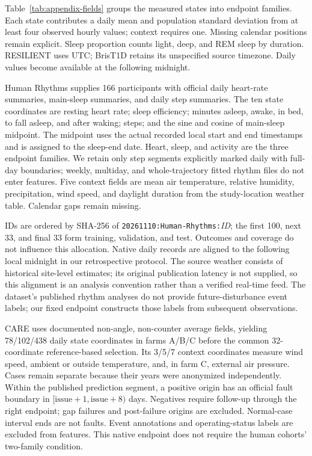 Table~\ref{tab:appendix-fields} groups the measured states into endpoint families. Each state contributes a daily mean and population standard deviation from at least four observed hourly values; context requires one. Missing calendar positions remain explicit. Sleep proportion counts light, deep, and REM sleep by duration. RESILIENT uses UTC; BrisT1D retains its unspecified source timezone. Daily values become available at the following midnight.

Human Rhythms \citep{hneD07} supplies 166 participants with official daily heart-rate summaries, main-sleep summaries, and daily step summaries. The ten state coordinates are resting heart rate; sleep efficiency; minutes asleep, awake, in bed, to fall asleep, and after waking; steps; and the sine and cosine of main-sleep midpoint. The midpoint uses the actual recorded local start and end timestamps and is assigned to the sleep-end date. Heart, sleep, and activity are the three endpoint families. We retain only step segments explicitly marked daily with full-day boundaries; weekly, multiday, and whole-trajectory fitted rhythm files do not enter features. Five context fields are mean air temperature, relative humidity, precipitation, wind speed, and daylight duration from the study-location weather table. Calendar gaps remain missing.

IDs are ordered by SHA-256 of \texttt{20261110:Human-Rhythms:}\textit{ID}; the first 100, next 33, and final 33 form training, validation, and test. Outcomes and coverage do not influence this allocation. Native daily records are aligned to the following local midnight in our retrospective protocol. The source weather consists of historical site-level estimates; its original publication latency is not supplied, so this alignment is an analysis convention rather than a verified real-time feed. The dataset's published rhythm analyses do not provide future-disturbance event labels; our fixed endpoint constructs those labels from subsequent observations.

CARE uses documented non-angle, non-counter average fields, yielding 78/102/438 daily state coordinates in farms A/B/C before the common 32-coordinate reference-based selection. Its 3/5/7 context coordinates measure wind speed, ambient or outside temperature, and, in farm C, external air pressure. Cases remain separate because their years were anonymized independently. Within the published prediction segment, a positive origin has an official fault boundary in $[\mathrm{issue}+1,\mathrm{issue}+8)$ days. Negatives require follow-up through the right endpoint; gap failures and post-failure origins are excluded. Normal-case interval ends are not faults. Event annotations and operating-status labels are excluded from features. This native endpoint does not require the human cohorts' two-family condition.

